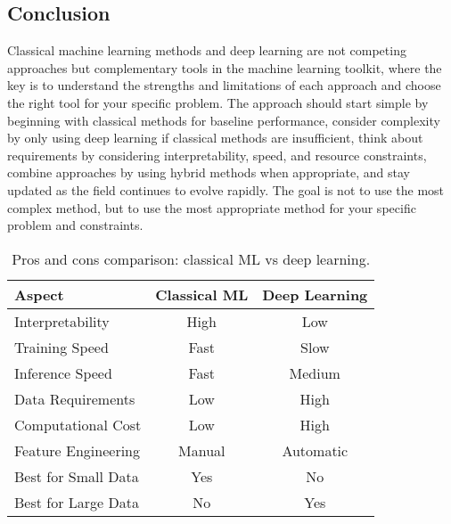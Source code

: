 \subsection{Conclusion}

Classical machine learning methods and deep learning are not competing approaches but complementary tools in the machine learning toolkit, where the key is to understand the strengths and limitations of each approach and choose the right tool for your specific problem. The approach should start simple by beginning with classical methods for baseline performance, consider complexity by only using deep learning if classical methods are insufficient, think about requirements by considering interpretability, speed, and resource constraints, combine approaches by using hybrid methods when appropriate, and stay updated as the field continues to evolve rapidly. The goal is not to use the most complex method, but to use the most appropriate method for your specific problem and constraints.

\begin{table}[htbp]
\centering
\begin{tabular}{lcc}
\toprule
Aspect & Classical ML & Deep Learning \\
\midrule
Interpretability & High & Low \\
Training Speed & Fast & Slow \\
Inference Speed & Fast & Medium \\
Data Requirements & Low & High \\
Computational Cost & Low & High \\
Feature Engineering & Manual & Automatic \\
Best for Small Data & Yes & No \\
Best for Large Data & No & Yes \\
\bottomrule
\end{tabular}
\caption{Pros and cons comparison: classical ML vs deep learning.}
\label{tab:ml-dl-pros-cons}
\end{table}
